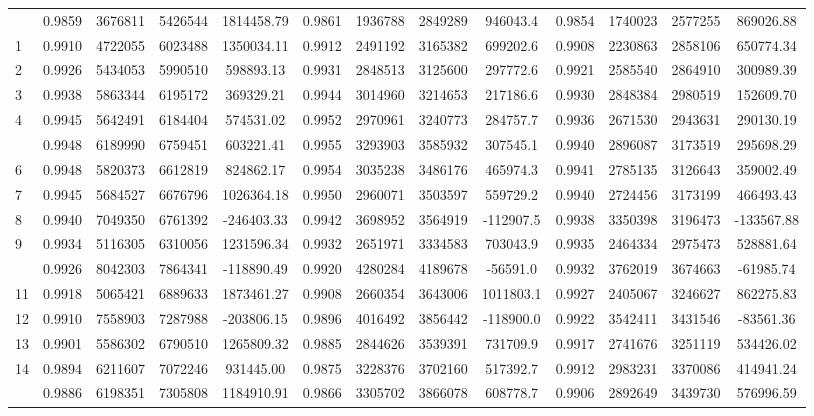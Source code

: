 \documentclass[
  12pt,
]{article}
\begin{document}
\begin{longtable}[t]{lcccccccccccc}
\endfoot
\bottomrule
\endlastfoot
0 & 0.9859 & 3676811 & 5426544 & 1814458.79 & 0.9861 & 1936788 & 2849289 & 946043.4 & 0.9854 & 1740023 & 2577255 & 869026.88\\
1 & 0.9910 & 4722055 & 6023488 & 1350034.11 & 0.9912 & 2491192 & 3165382 & 699202.6 & 0.9908 & 2230863 & 2858106 & 650774.34\\
2 & 0.9926 & 5434053 & 5990510 & 598893.13 & 0.9931 & 2848513 & 3125600 & 297772.6 & 0.9921 & 2585540 & 2864910 & 300989.39\\
3 & 0.9938 & 5863344 & 6195172 & 369329.21 & 0.9944 & 3014960 & 3214653 & 217186.6 & 0.9930 & 2848384 & 2980519 & 152609.70\\
4 & 0.9945 & 5642491 & 6184404 & 574531.02 & 0.9952 & 2970961 & 3240773 & 284757.7 & 0.9936 & 2671530 & 2943631 & 290130.19\\
\addlinespace
5 & 0.9948 & 6189990 & 6759451 & 603221.41 & 0.9955 & 3293903 & 3585932 & 307545.1 & 0.9940 & 2896087 & 3173519 & 295698.29\\
6 & 0.9948 & 5820373 & 6612819 & 824862.17 & 0.9954 & 3035238 & 3486176 & 465974.3 & 0.9941 & 2785135 & 3126643 & 359002.49\\
7 & 0.9945 & 5684527 & 6676796 & 1026364.18 & 0.9950 & 2960071 & 3503597 & 559729.2 & 0.9940 & 2724456 & 3173199 & 466493.43\\
8 & 0.9940 & 7049350 & 6761392 & -246403.33 & 0.9942 & 3698952 & 3564919 & -112907.5 & 0.9938 & 3350398 & 3196473 & -133567.88\\
9 & 0.9934 & 5116305 & 6310056 & 1231596.34 & 0.9932 & 2651971 & 3334583 & 703043.9 & 0.9935 & 2464334 & 2975473 & 528881.64\\
\addlinespace
10 & 0.9926 & 8042303 & 7864341 & -118890.49 & 0.9920 & 4280284 & 4189678 & -56591.0 & 0.9932 & 3762019 & 3674663 & -61985.74\\
11 & 0.9918 & 5065421 & 6889633 & 1873461.27 & 0.9908 & 2660354 & 3643006 & 1011803.1 & 0.9927 & 2405067 & 3246627 & 862275.83\\
12 & 0.9910 & 7558903 & 7287988 & -203806.15 & 0.9896 & 4016492 & 3856442 & -118900.0 & 0.9922 & 3542411 & 3431546 & -83561.36\\
13 & 0.9901 & 5586302 & 6790510 & 1265809.32 & 0.9885 & 2844626 & 3539391 & 731709.9 & 0.9917 & 2741676 & 3251119 & 534426.02\\
14 & 0.9894 & 6211607 & 7072246 & 931445.00 & 0.9875 & 3228376 & 3702160 & 517392.7 & 0.9912 & 2983231 & 3370086 & 414941.24\\
\addlinespace
15 & 0.9886 & 6198351 & 7305808 & 1184910.91 & 0.9866 & 3305702 & 3866078 & 608778.7 & 0.9906 & 2892649 & 3439730 & 576996.59\\

\end{longtable}
\end{document}
